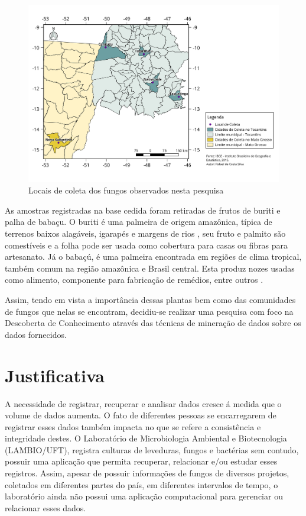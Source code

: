 \documentclass[tcc2]{classe_uftex/uftex}
\begin{document}
    \begin{figure}[hbt]
    \centering
      \includegraphics[scale=0.5]{TCC_Johnny/pdf/mapa_coleta.pdf}
      \caption{Locais de coleta dos fungos observados nesta pesquisa}
      \label{fig:fig005}
    \end{figure}

As amostras registradas na base cedida foram retiradas de frutos de buriti e palha de babaçu. O buriti é uma palmeira de origem amazônica, típica de terrenos baixos alagáveis, igarapés e margens de rios \cite{2018:Ferreira}, seu fruto e palmito são comestíveis e a folha pode ser usada como cobertura para casas ou fibras para artesanato. Já o babaçú, é uma palmeira encontrada em regiões de clima tropical, também comum na região amazônica e Brasil central. Esta produz nozes usadas como alimento, componente para fabricação de remédios, entre outros \cite{babcu:babcu}. 

Assim, tendo em vista a importância dessas plantas bem como das comunidades de fungos que nelas se encontram, decidiu-se realizar uma pesquisa com foco na Descoberta de Conhecimento através das técnicas de mineração de dados sobre os dados fornecidos.


\section{Justificativa}
\label{sec:justificativa}
A necessidade de registrar, recuperar e analisar dados cresce á medida que o volume de dados aumenta. O fato de diferentes pessoas se encarregarem de registrar esses dados também impacta no que se refere a consistência e integridade destes. O Laboratório de Microbiologia Ambiental e Biotecnologia (LAMBIO/UFT), registra culturas de leveduras, fungos e bactérias sem contudo, possuir uma aplicação que permita recuperar, relacionar e/ou estudar esses registros. Assim, apesar de possuir informações de fungos de diversos projetos, coletados em diferentes partes do país, em diferentes intervalos de tempo, o laboratório ainda não possui uma aplicação computacional para gerenciar ou relacionar esses dados.
\end{document}
